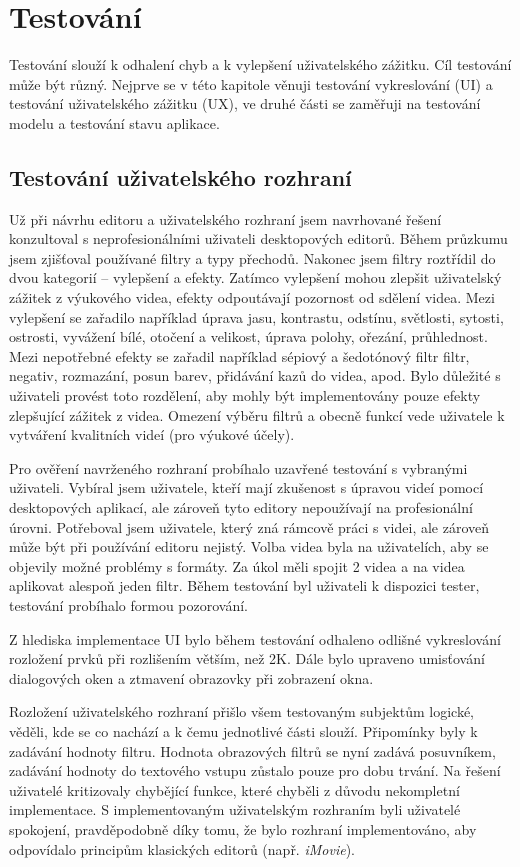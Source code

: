 \chapter{Testování}
Testování slouží k odhalení chyb a k vylepšení uživatelského zážitku. Cíl testování může být různý. Nejprve se v této kapitole věnuji testování vykreslování (UI) a testování uživatelského zážitku (UX), ve druhé části se zaměřuji na testování modelu a testování stavu aplikace.

\section{Testování uživatelského rozhraní}
Už při návrhu editoru a uživatelského rozhraní jsem navrhované řešení konzultoval s neprofesionálními uživateli desktopových editorů. Během průzkumu jsem zjišťoval používané filtry a typy přechodů. Nakonec jsem filtry roztřídil do dvou kategorií -- vylepšení a efekty. Zatímco vylepšení mohou zlepšit uživatelský zážitek z výukového videa, efekty odpoutávají pozornost od sdělení videa. Mezi vylepšení se zařadilo například úprava jasu, kontrastu, odstínu, světlosti, sytosti, ostrosti, vyvážení bílé, otočení a velikost, úprava polohy, ořezání, průhlednost. Mezi nepotřebné efekty se zařadil například sépiový a šedotónový filtr filtr, negativ, rozmazání, posun barev, přidávání kazů do videa, apod. Bylo důležité s uživateli provést toto rozdělení, aby mohly být implementovány pouze efekty zlepšující zážitek z videa. Omezení výběru filtrů a obecně funkcí vede uživatele k vytváření kvalitních videí (pro výukové účely).

Pro ověření navrženého rozhraní probíhalo uzavřené testování s vybranými uživateli. Vybíral jsem uživatele, kteří mají zkušenost s úpravou videí pomocí desktopových aplikací, ale zároveň tyto editory nepoužívají na profesionální úrovni. Potřeboval jsem uživatele, který zná rámcově práci s videi, ale zároveň může být při používání editoru nejistý. Volba videa byla na uživatelích, aby se objevily možné problémy s formáty. Za úkol měli spojit 2 videa a na videa aplikovat alespoň jeden filtr. Během testování byl uživateli k dispozici tester, testování probíhalo formou pozorování.

Z hlediska implementace UI bylo během testování odhaleno odlišné vykreslování rozložení prvků při rozlišením větším, než 2K. Dále bylo upraveno umisťování dialogových oken a ztmavení obrazovky při zobrazení okna.

Rozložení uživatelského rozhraní přišlo všem testovaným subjektům logické, věděli, kde se co nachází a k čemu jednotlivé části slouží. Připomínky byly k zadávání hodnoty filtru. Hodnota obrazových filtrů se nyní zadává posuvníkem, zadávání hodnoty do textového vstupu zůstalo pouze pro dobu trvání. Na řešení uživatelé kritizovaly chybějící funkce, které chyběli z důvodu nekompletní implementace. S implementovaným uživatelským rozhraním byli uživatelé spokojení, pravděpodobně díky tomu, že bylo rozhraní implementováno, aby odpovídalo principům klasických editorů (např. \textit{iMovie}).

